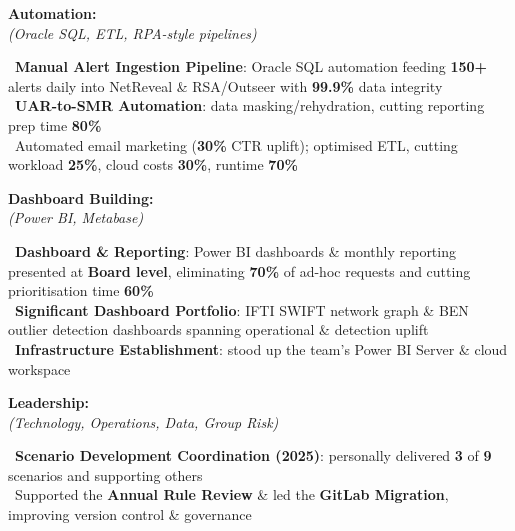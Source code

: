 \documentclass[11pt,a4paper]{article}
\begin{document}
\begin{minipage}{\textwidth}
\begin{minipage}[t]{\textwidth-19pt}
\vspace{6pt}

\noindent\begin{minipage}[t]{0.28\textwidth}
\textbf{\color{headerblue}Automation:}\\[0pt]
\textit{(Oracle SQL, ETL, RPA-style pipelines)}
\end{minipage}%
\hfill%
\begin{minipage}[t]{0.68\textwidth}
\textbullet\ \textbf{Manual Alert Ingestion Pipeline}: Oracle SQL automation feeding \textbf{150+} alerts daily into NetReveal \& RSA/Outseer with \textbf{99.9\%} data integrity\\
\textbullet\ \textbf{UAR-to-SMR Automation}: data masking/rehydration, cutting reporting prep time \textbf{80\%}\\
\textbullet\ Automated email marketing (\textbf{30\%} CTR uplift); optimised ETL, cutting workload \textbf{25\%}, cloud costs \textbf{30\%}, runtime \textbf{70\%}
\end{minipage}

\vspace{6pt}

\noindent\begin{minipage}[t]{0.28\textwidth}
\textbf{\color{headerblue}Dashboard Building:}\\[0pt]
\textit{(Power BI, Metabase)}
\end{minipage}%
\hfill%
\begin{minipage}[t]{0.68\textwidth}
\textbullet\ \textbf{Dashboard \& Reporting}: Power BI dashboards \& monthly reporting presented at \textbf{Board level}, eliminating \textbf{70\%} of ad-hoc requests and cutting prioritisation time \textbf{60\%}\\
\textbullet\ \textbf{Significant Dashboard Portfolio}: IFTI SWIFT network graph \& BEN outlier detection dashboards spanning operational \& detection uplift\\
\textbullet\ \textbf{Infrastructure Establishment}: stood up the team's Power BI Server \& cloud workspace
\end{minipage}

\vspace{6pt}

\noindent\begin{minipage}[t]{0.28\textwidth}
\textbf{\color{headerblue}Leadership:}\\[0pt]
\textit{(Technology, Operations, Data, Group Risk)}
\end{minipage}%
\hfill%
\begin{minipage}[t]{0.68\textwidth}
\textbullet\ \textbf{Scenario Development Coordination (2025)}: personally delivered \textbf{3} of \textbf{9} scenarios and supporting others\\
\textbullet\ Supported the \textbf{Annual Rule Review} \& led the \textbf{GitLab Migration}, improving version control \& governance
\end{minipage}

\end{minipage}
\end{minipage}
\end{document}
